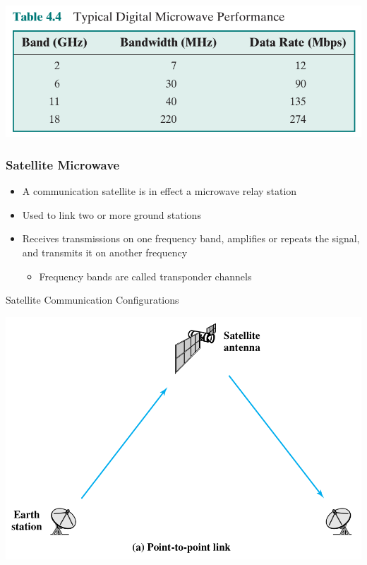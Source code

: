 \documentclass[pdflatex,compress]{beamer}
\begin{document}
\begin{frame}
	\begin{center}
		\includegraphics[width=0.9\linewidth]{img/img19}
	\end{center}
\end{frame}

\begin{frame}
	\frametitle{Satellite Microwave}
	\begin{itemize}
		\item A communication satellite is in effect a microwave relay station
		\item Used to link two or more ground stations
		\item Receives transmissions on one frequency band, amplifies or repeats the signal, and transmits it on another frequency
		\begin{itemize}
			\item Frequency bands are called transponder channels
		\end{itemize}
	\end{itemize}
\end{frame}

\begin{frame}{Satellite Communication Configurations}
	\begin{center}
		\includegraphics[height=0.8\textheight]{img/img20a}
	\end{center}
\end{frame}
\end{document}
